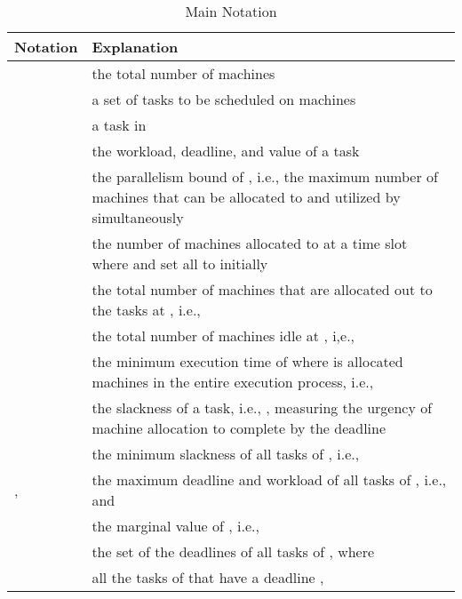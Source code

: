 \documentclass[10pt,journal,compsoc]{IEEEtran}
\begin{document}
\begin{table}
\centering
\begin{threeparttable}[!ht]

\caption{Main Notation}
\begin{tabular}{|C{1.5cm}|C{6.2cm}|}
\hline

   Notation & Explanation\\ \hline

 & the total number of machines \\ \hline

 & a set of tasks to be scheduled on  machines \\ \hline

 & a task in  \\ \hline

 & the workload, deadline, and value of a task  \\ \hline

 & the parallelism bound of , i.e., the maximum number of machines that can be allocated to and utilized by  simultaneously \\ \hline

 & the number of machines allocated to  at a time slot  where  and set all  to  initially \\ \hline

 & the total number of machines that are allocated out to the tasks at , i.e.,  \\ \hline

 &  the total number of machines idle at , i,e.,  \\ \hline


 & the minimum execution time of  where  is allocated  machines in the entire execution process, i.e., \\ \hline

 & the slackness of a task, i.e., , measuring the urgency of machine allocation to complete  by the deadline \\ \hline

  &  the minimum slackness of all tasks of , i.e.,  \\ \hline

,  & the maximum deadline and workload of all tasks of , i.e.,  and  \\ \hline

 & the marginal value of , i.e.,  \\ \hline

 & the set of the deadlines  of all tasks  of , where  \\ \hline

 & all the tasks  of  that have a deadline ,  \\ \hline

\end{tabular}
\label{table-1}
 \end{threeparttable}
\end{table}
\end{document}

